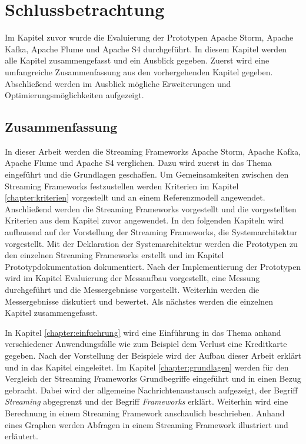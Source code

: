 \chapter{Schlussbetrachtung}
\label{sec:schlussbetrachtung}

Im Kapitel zuvor wurde die Evaluierung der Prototypen Apache Storm, Apache Kafka, Apache Flume und Apache S4 durchgeführt. In diesem Kapitel werden alle Kapitel zusammengefasst und ein Ausblick gegeben. Zuerst wird eine umfangreiche Zusammenfassung aus den vorhergehenden Kapitel gegeben. Abschließend werden im Ausblick mögliche Erweiterungen und Optimierungsmöglichkeiten aufgezeigt.

\section{Zusammenfassung}

In dieser Arbeit werden die Streaming Frameworks Apache Storm, Apache Kafka, Apache Flume und Apache S4 verglichen. Dazu wird zuerst in das Thema eingeführt und die Grundlagen geschaffen. Um Gemeinsamkeiten zwischen den Streaming Frameworks festzustellen werden Kriterien im Kapitel \ref{chapter:kriterien} vorgestellt und an einem Referenzmodell angewendet. Anschließend werden
die Streaming Frameworks vorgestellt und die vorgestellten Kriterien aus dem Kapitel zuvor angewendet. In den folgenden Kapiteln wird aufbauend auf der Vorstellung der Streaming Frameworks, die Systemarchitektur vorgestellt. Mit der Deklaration der Systemarchitektur werden die Prototypen zu den einzelnen Streaming Frameworks erstellt und im Kapitel Prototypdokumentation dokumentiert. Nach der Implementierung der Prototypen wird im Kapitel Evaluierung der Messaufbau vorgestellt, eine Messung durchgeführt und die Messergebnisse vorgestellt. Weiterhin werden die Messergebnisse diskutiert und bewertet. Als nächstes werden die einzelnen Kapitel zusammengefasst.

In Kapitel \ref{chapter:einfuehrung} wird eine Einführung in das Thema anhand verschiedener Anwendungsfälle wie zum Beispiel dem Verlust eine Kreditkarte gegeben. Nach der Vorstellung der Beispiele wird der Aufbau dieser Arbeit erklärt und in das Kapitel  eingeleitet. Im Kapitel \ref{chapter:grundlagen} werden für den Vergleich der Streaming Frameworks Grundbegriffe eingeführt und in einen Bezug gebracht. Dabei wird der allgemeine Nachrichtenaustausch aufgezeigt, der Begriff \textit{Streaming} abgegrenzt und der Begriff \textit{Frameworks} erklärt. Weiterhin wird eine Berechnung in einem Streaming Framework anschaulich beschrieben. Anhand eines Graphen werden Abfragen in einem Streaming Framework illustriert und erläutert.


